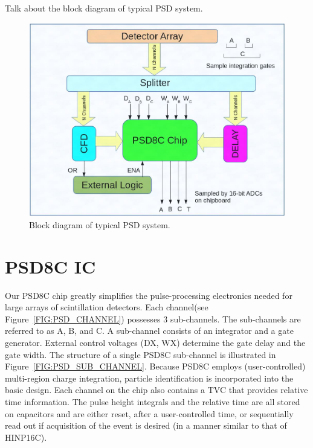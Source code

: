 \documentclass[12pt,oneside,final]{siuethesis}
\theoremstyle{definition}
\begin{document}
Talk about the block diagram of typical PSD system.

\begin{figure}[htbp!]
	\centering
 	\includegraphics[scale=0.6,keepaspectratio=true]{./ch1_figures/PSD_block.png}
 	\caption{Block diagram of typical PSD system.}
 	\label{FIG:PSD_BLOCK}
\end{figure}


\section{PSD8C IC}

Our PSD8C chip greatly simplifies the pulse-processing electronics needed for large arrays of scintillation detectors. Each channel(see Figure~\ref{FIG:PSD_CHANNEL}) possesses 3 sub-channels. The sub-channels are referred to as A, B, and C. A sub-channel consists of an integrator and a gate generator. External control voltages (DX, WX) determine the gate delay and the gate width. The structure of a single PSD8C sub-channel is illustrated in Figure~\ref{FIG:PSD_SUB_CHANNEL}. Because PSD8C employs (user-controlled) multi-region charge integration, particle identification is incorporated into the basic design. Each channel on the chip also contains a TVC that provides relative time information. The pulse height integrals and the relative time are all stored on capacitors and are either reset, after a user-controlled time, or sequentially read out if acquisition of the event is desired (in a manner similar to that of HINP16C). 
\end{document}
